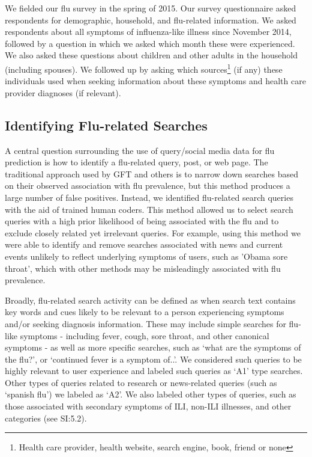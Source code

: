 \documentclass[fleqn,10pt]{wlscirep}
\begin{document}
We fielded our flu survey in the spring of 2015. Our survey questionnaire asked respondents for demographic, household, and flu-related information. We asked respondents about all symptoms of influenza-like illness since November 2014, followed by a question in which we asked which month these were experienced. We also asked these questions about children and other adults in the household (including spouses). We followed up by asking which sources\footnote{Health care provider, health website, search engine, book, friend or none} (if any) these individuals used when seeking information about these symptoms and health care provider diagnoses (if relevant).

\subsection*{Identifying Flu-related Searches}

A central question surrounding the use of query/social media data for flu prediction is how to identify a flu-related query, post, or web page. The traditional approach used by GFT and others is to narrow down searches based on their observed association with flu prevalence, but this method produces a large number of false positives. Instead, we identified flu-related search queries with the aid of trained human coders. This method allowed us to select search queries with a high prior likelihood of being associated with the flu and to exclude closely related yet irrelevant queries. For example, using this method we were able to identify and remove searches associated with news and current events unlikely to reflect underlying symptoms of users, such as 'Obama sore throat', which with other methods may be misleadingly associated with flu prevalence. 

Broadly, flu-related search activity can be defined as when search text contains key words and cues likely to be relevant to a person experiencing symptoms and/or seeking diagnosis information. These may include simple searches for flu-like symptoms - including fever, cough, sore throat, and other canonical symptoms - as well as more specific searches, such as `what are the symptoms of the flu?', or `continued fever is a symptom of..'. We considered such queries to be highly relevant to user experience and labeled such queries as `A1' type searches. Other types of queries related to research or news-related queries (such as `spanish flu') we labeled as `A2'. We also labeled other types of queries, such as those associated with secondary symptoms of ILI, non-ILI illnesses, and other categories (see SI:5.2). 
\end{document}
